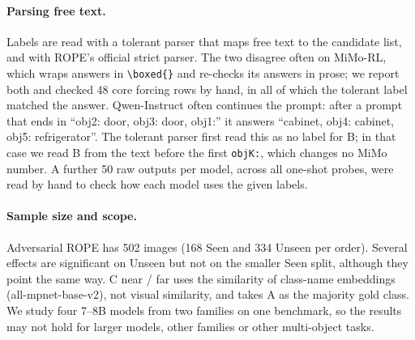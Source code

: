 \paragraph{Parsing free text.} Labels are read with a tolerant parser that maps free text to the
candidate list, and with ROPE's official strict parser. The two disagree often on MiMo-RL, which wraps answers
in \texttt{\textbackslash boxed\{\}} and re-checks its answers in prose; we report both and checked
48 core forcing rows by hand, in all of which the tolerant label matched the answer. Qwen-Instruct
often continues the prompt: after a prompt that ends in ``obj2: door, obj3: door, obj1:'' it answers
``cabinet, obj4: cabinet, obj5: refrigerator''. The tolerant parser first read this as no label for B; in that case we read B from the text before the
first \texttt{objK:}, which changes no MiMo number. A further 50 raw outputs per model, across all
one-shot probes, were read by hand to check how each model uses the given labels.

\paragraph{Sample size and scope.} Adversarial ROPE has 502 images (168 Seen and 334 Unseen per
order). Several effects are significant on Unseen but not on the smaller Seen split, although they
point the same way. C near / far uses the similarity of class-name embeddings
(all-mpnet-base-v2), not visual similarity, and takes A as the majority gold class. We study four
7--8B models from two families on one benchmark, so the results may not hold for larger models,
other families or other multi-object tasks. \tbd{}
